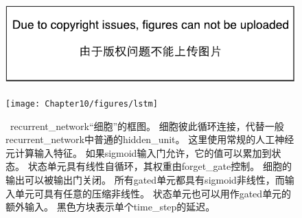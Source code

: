 
\begin{figure}[!htb]
\ifOpenSource
\centerline{\includegraphics{figure.pdf}}
\else
\centerline{\texttt{[image: Chapter10/figures/lstm]}}
\fi
\caption{~\gls{recurrent_network}``细胞''的框图。
细胞彼此循环连接，代替一般\gls{recurrent_network}中普通的\gls{hidden_unit}。
这里使用常规的人工神经元计算输入特征。
如果sigmoid输入门允许，它的值可以累加到状态。
状态单元具有线性自循环，其权重由\gls{forget_gate}控制。
细胞的输出可以被输出门关闭。
所有\gls{gated}单元都具有sigmoid非线性，而输入单元可具有任意的压缩非线性。
状态单元也可以用作\gls{gated}单元的额外输入。
黑色方块表示单个\gls{time_step}的延迟。
}
\label{fig:chap10_lstm}
\end{figure}

